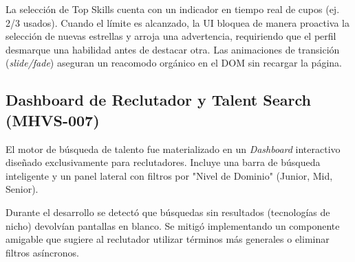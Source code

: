 \begin{NotaTecnica}
La selección de Top Skills cuenta con un indicador en tiempo real de cupos (ej. 2/3 usados). Cuando el límite es alcanzado, la UI bloquea de manera proactiva la selección de nuevas estrellas y arroja una advertencia, requiriendo que el perfil desmarque una habilidad antes de destacar otra. Las animaciones de transición (\textit{slide/fade}) aseguran un reacomodo orgánico en el DOM sin recargar la página.
\end{NotaTecnica}

\subsection{Dashboard de Reclutador y Talent Search (MHVS-007)}
El motor de búsqueda de talento fue materializado en un \textit{Dashboard} interactivo diseñado exclusivamente para reclutadores. Incluye una barra de búsqueda inteligente y un panel lateral con filtros por "Nivel de Dominio" (Junior, Mid, Senior).

\begin{AlertaDefecto}
Durante el desarrollo se detectó que búsquedas sin resultados (tecnologías de nicho) devolvían pantallas en blanco. Se mitigó implementando un componente  amigable que sugiere al reclutador utilizar términos más generales o eliminar filtros asíncronos.
\end{AlertaDefecto}
